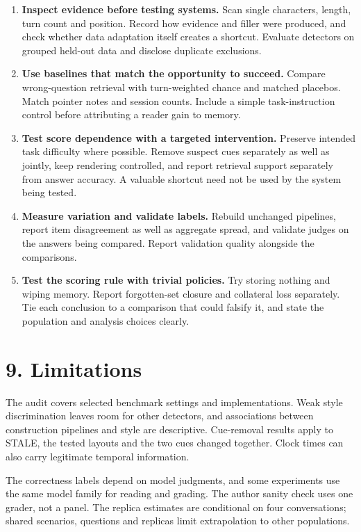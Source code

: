 \documentclass[11pt]{article}
\providecommand{\tightlist}{\setlength{\itemsep}{0pt}\setlength{\parskip}{0pt}}
\begin{document}
\begin{enumerate}
\def\labelenumi{\arabic{enumi}.}
\tightlist
\item
  \textbf{Inspect evidence before testing systems.} Scan single characters, length, turn count and position. Record how evidence and filler were produced, and check whether data adaptation itself creates a shortcut. Evaluate detectors on grouped held-out data and disclose duplicate exclusions.
\item
  \textbf{Use baselines that match the opportunity to succeed.} Compare wrong-question retrieval with turn-weighted chance and matched placebos. Match pointer notes and session counts. Include a simple task-instruction control before attributing a reader gain to memory.
\item
  \textbf{Test score dependence with a targeted intervention.} Preserve intended task difficulty where possible. Remove suspect cues separately as well as jointly, keep rendering controlled, and report retrieval support separately from answer accuracy. A valuable shortcut need not be used by the system being tested.
\item
  \textbf{Measure variation and validate labels.} Rebuild unchanged pipelines, report item disagreement as well as aggregate spread, and validate judges on the answers being compared. Report validation quality alongside the comparisons.
\item
  \textbf{Test the scoring rule with trivial policies.} Try storing nothing and wiping memory. Report forgotten-set closure and collateral loss separately. Tie each conclusion to a comparison that could falsify it, and state the population and analysis choices clearly.
\end{enumerate}

\label{main-9}

\section{9. Limitations}\label{limitations}

The audit covers selected benchmark settings and implementations. Weak style discrimination leaves room for other detectors, and associations between construction pipelines and style are descriptive. Cue-removal results apply to STALE, the tested layouts and the two cues changed together. Clock times can also carry legitimate temporal information.

The correctness labels depend on model judgments, and some experiments use the same model family for reading and grading. The author sanity check uses one grader, not a panel. The replica estimates are conditional on four conversations; shared scenarios, questions and replicas limit extrapolation to other populations.
\end{document}
